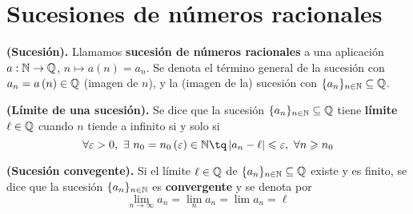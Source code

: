{

\section{Sucesiones de números racionales}
\begin{defi}
    \textbf{(Sucesión).} Llamamos \textbf{sucesión de números racionales} a una aplicación $a:\mathbb{N}\to\mathbb{Q}$, $n\mapsto a\left( n \right) = a_n$. Se denota el término general de la sucesión con $a_n = a\left( n \right) \in\mathbb{Q}$ (imagen de $n$), y la (imagen de la) sucesión con $\{a_n\}_{n\in\mathbb{N}}\subseteq\mathbb{Q}$.
\end{defi}

\begin{defi}
    \textbf{(Límite de una sucesión).} Se dice que la sucesión $\{a_n\}_{n\in\mathbb{N}}\subseteq\mathbb{Q} $ tiene \textbf{límite} $\ell\in\mathbb{Q}$ cuando $n$ tiende a infinito si y solo si
    \begin{equation}
        \forall\epsilon > 0,\ \exists\ n_0 = n_0\left( \epsilon \right)\in\N\tq \abs{a_n - \ell}\leq \epsilon,\ \forall n\geq n_0
    \end{equation}
\end{defi}

\begin{defi}
    \textbf{(Sucesión convegente).} Si el límite $\ell\in\mathbb{Q}$ de $\{a_n\}_{n\in\mathbb{N}}\subseteq\mathbb{Q} $ existe y es finito, se dice que la sucesión $\{a_n\}_{n\in\mathbb{N}} $ es \textbf{convergente} y se denota por
    \begin{equation}
        \lim_{n\to\infty} a_n  = \lim_n a_n = \lim a_n = \ell
    \end{equation}
\end{defi}

}
